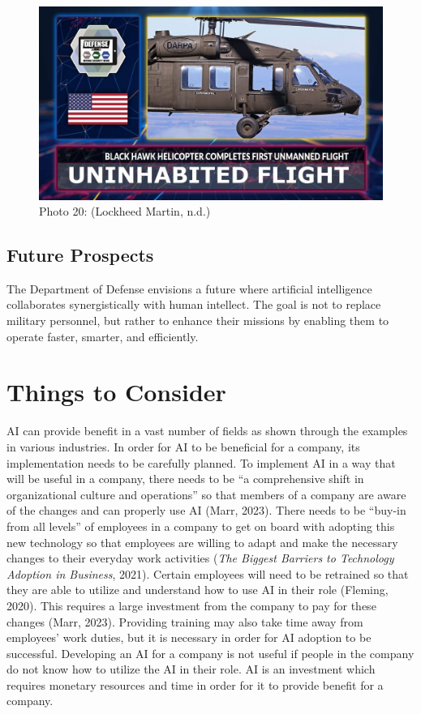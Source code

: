 \documentclass[
]{article}
\begin{document}
\begin{figure}
\centering
\includegraphics{Hawk.jpg}
\caption{Photo 20: (Lockheed Martin, n.d.)}
\end{figure}

\hypertarget{future-prospects}{%
\subsection{Future Prospects}\label{future-prospects}}

The Department of Defense envisions a future where artificial intelligence collaborates synergistically with human intellect. The goal is not to replace military personnel, but rather to enhance their missions by enabling them to operate faster, smarter, and efficiently.

\hypertarget{things-to-consider}{%
\section{Things to Consider}\label{things-to-consider}}

AI can provide benefit in a vast number of fields as shown through the examples in various industries. In order for AI to be beneficial for a company, its implementation needs to be carefully planned. To implement AI in a way that will be useful in a company, there needs to be ``a comprehensive shift in organizational culture and operations'' so that members of a company are aware of the changes and can properly use AI (Marr, 2023). There needs to be ``buy-in from all levels'' of employees in a company to get on board with adopting this new technology so that employees are willing to adapt and make the necessary changes to their everyday work activities (\emph{The Biggest Barriers to Technology Adoption in Business}, 2021). Certain employees will need to be retrained so that they are able to utilize and understand how to use AI in their role (Fleming, 2020). This requires a large investment from the company to pay for these changes (Marr, 2023). Providing training may also take time away from employees' work duties, but it is necessary in order for AI adoption to be successful. Developing an AI for a company is not useful if people in the company do not know how to utilize the AI in their role. AI is an investment which requires monetary resources and time in order for it to provide benefit for a company.
\end{document}
